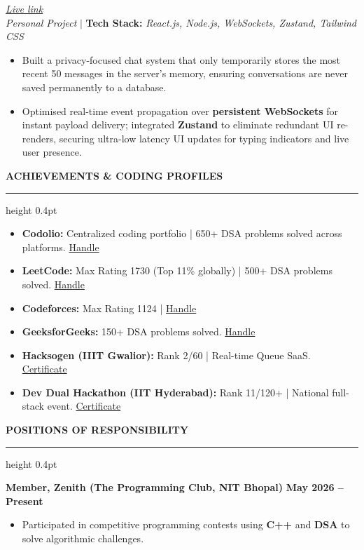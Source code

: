 \documentclass[a4paper,10pt]{article}
\newcommand{\ressection}[1]{%
  \vspace{8pt}%
  {\large\bfseries #1}\par%
  \kern 5pt%
  \hrule height 0.4pt%
  \vspace{4pt}%
}
\begin{document}
\href{https://chatty-psi-two.vercel.app/}{\textit{Live link}} \\[2pt]
\noindent\textit{Personal Project} $|$ {\small \textbf{Tech Stack:} \textit{React.js, Node.js, WebSockets, Zustand, Tailwind CSS}}
\begin{itemize}[label={--}, leftmargin=15pt, itemsep=2pt, topsep=2pt]
\item Built a privacy-focused chat system that only temporarily stores the most recent 50 messages in the server's memory, ensuring conversations are never saved permanently to a database.
\item Optimised real-time event propagation over \textbf{persistent WebSockets} for instant payload delivery; integrated \textbf{Zustand} to eliminate redundant UI re-renders, securing ultra-low latency UI updates for typing indicators and live user presence.
\end{itemize}

\ressection{ACHIEVEMENTS \& CODING PROFILES}
\begin{itemize}[label={\textbullet}, leftmargin=15pt, itemsep=2pt, topsep=2pt]
  \item \textbf{Codolio:} Centralized coding portfolio | 650+ DSA problems solved across platforms. \href{https://codolio.com/profile/vaishnav}{Handle}
  \item \textbf{LeetCode:} Max Rating 1730 (Top 11\% globally) | 500+ DSA problems solved. \href{https://leetcode.com/u/Dexter_Morgan_11/}{Handle}
  \item \textbf{Codeforces:} Max Rating 1124 | \href{https://codeforces.com/profile/DexterMorgan11}{Handle}
  \item \textbf{GeeksforGeeks:} 150+ DSA problems solved. \href{https://www.geeksforgeeks.org/profile/wolfman1a0x}{Handle}
  \item \textbf{Hacksogen (IIIT Gwalior):} Rank 2/60 | Real-time Queue SaaS. \href{https://drive.google.com/file/d/1nmm-nGwa0UR6mkbwFsYoZg68uAosnPP_/view?usp=sharing}{Certificate}
  \item \textbf{Dev Dual Hackathon (IIT Hyderabad):} Rank 11/120+ | National full-stack event. \href{https://drive.google.com/file/d/1RSsvjbV7ymJkxJprlhHcTRNZsL9EQmlx/view?usp=sharing}{Certificate}
\end{itemize}

\ressection{POSITIONS OF RESPONSIBILITY}
\vspace{2pt}
\noindent\textbf{Member, Zenith (The Programming Club, NIT Bhopal)} \hfill \textbf{May 2026 -- Present}
\begin{itemize}[label={\textbullet}, leftmargin=15pt, itemsep=1pt, topsep=1pt]
    \item Participated in competitive programming contests using \textbf{C++} and \textbf{DSA} to solve algorithmic challenges.
\end{itemize}
\vspace{3pt}
\end{document}
